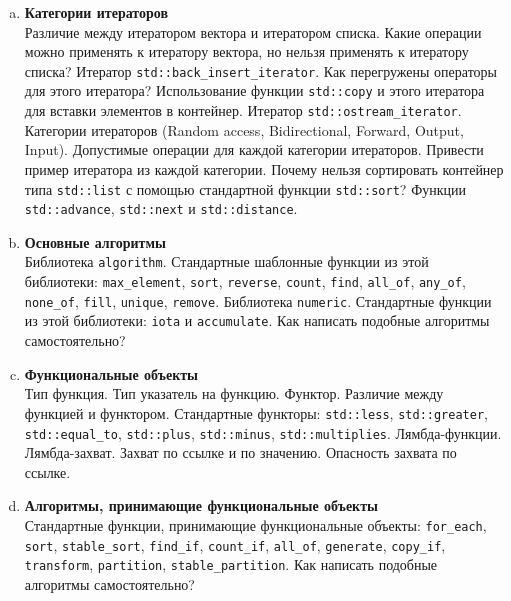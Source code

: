 \documentclass{article}
\begin{document}
\begin{enumerate}
\begin{enumerate}[a.]
\item \textbf{Категории итераторов}\\
Различие между итератором вектора и итератором списка. Какие операции можно применять к итератору вектора, но нельзя применять к итератору списка? Итератор \texttt{std::back\_insert\_iterator}. Как перегружены операторы для этого итератора? Использование функции \texttt{std::copy} и этого итератора для вставки элементов в контейнер. Итератор \texttt{std::ostream\_iterator}. Категории итераторов (Random access, Bidirectional, Forward, Output, Input). Допустимые операции для каждой категории итераторов. Привести пример итератора из каждой категории. Почему нельзя сортировать контейнер типа \texttt{std::list} с помощью стандартной функции \texttt{std::sort}? Функции \texttt{std::advance}, \texttt{std::next} и \texttt{std::distance}.


\item \textbf{Основные алгоритмы}\\
Библиотека \texttt{algorithm}. Стандартные шаблонные функции из этой библиотеки: \texttt{max\_element}, \texttt{sort}, \texttt{reverse}, \texttt{count}, \texttt{find}, \texttt{all\_of}, \texttt{any\_of}, \texttt{none\_of}, \texttt{fill}, \texttt{unique}, \texttt{remove}. Библиотека \texttt{numeric}. Стандартные функции из этой библиотеки: \texttt{iota} и \texttt{accumulate}. Как написать подобные алгоритмы самостоятельно?


\item \textbf{Функциональные объекты}\\
Тип функция. Тип указатель на функцию. Функтор. Различие между функцией и функтором. Стандартные функторы: \texttt{std::less}, \texttt{std::greater}, \texttt{std::equal\_to}, \texttt{std::plus}, \texttt{std::minus}, \texttt{std::multiplies}. Лямбда-функции. Лямбда-захват. Захват по ссылке и по значению. Опасность захвата по ссылке.


\item \textbf{Алгоритмы, принимающие функциональные объекты}\\
Стандартные функции, принимающие функциональные объекты: \texttt{for\_each}, \texttt{sort}, \texttt{stable\_sort}, \texttt{find\_if}, \texttt{count\_if}, \texttt{all\_of}, \texttt{generate}, \texttt{copy\_if}, \texttt{transform}, \texttt{partition}, \texttt{stable\_partition}. Как написать подобные алгоритмы самостоятельно?

\end{enumerate}




\end{enumerate}
\end{document}
